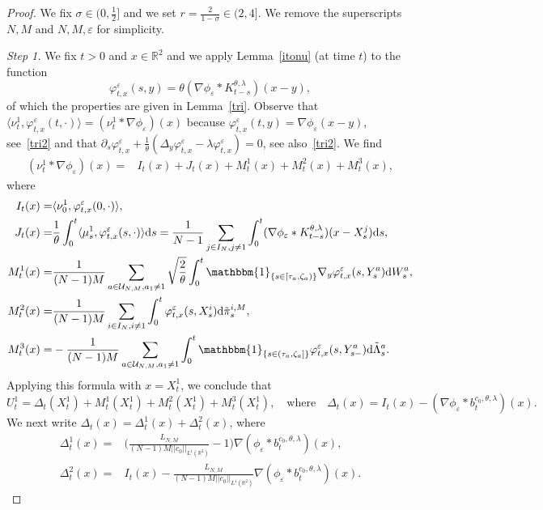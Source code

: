 \documentclass[11pt]{article}
\newcommand{\R}{\mathbb{R}}
\newcommand{\1}{\mathbbm{1}}
\newcommand{\dd}{{\rm d}}
\newcommand{\Uu}{\mathcal U}
\newcommand{\e}{\varepsilon}
\newcommand{\sm}{{s-}}
\newcommand{\vip}{\vskip5pt}
\begin{document}
\begin{proof}
We fix $\sigma\in (0,\frac12]$ and we set $r= \frac2{1-\sigma}\in (2,4]$. We remove the superscripts $N,M$ and $N,M,\e$ for simplicity.

\vip
{\it Step 1.} We fix $t>0$ and $x\in \R^2$ and we apply Lemma~\ref{itonu} (at time $t$) to the function
$$
\varphi^\e_{t,x}(s,y)=\theta(\nabla \phi_\e \ast K^{\theta,\lambda}_{t-s})(x-y), 
$$
of which the properties are given in Lemma~\ref{tri}.
Observe that $\langle \nu^1_t,\varphi^\e_{t,x}(t,\cdot)\rangle=
(\nu^1_t\ast \nabla \phi_\e)(x)$ because $\varphi^\e_{t,x}(t,y)=\nabla \phi_\e(x-y)$, see~\eqref{tri2}
and that $\partial_s \varphi^\e_{t,x}+\frac1\theta(\Delta_y\varphi^\e_{t,x}-\lambda\varphi^\e_{t,x})=0$, see 
also~\eqref{tri2}. We find
\begin{align}\label{tbua}
(\nu^1_t\ast \nabla \phi_\e)(x)=& I_t(x)+ J_t(x)+M^1_t(x)+M^2_t(x)+M^3_t(x),
\end{align}
where
\begin{align*}
I_t(x)=&\langle \nu^1_0,\varphi^\e_{t,x}(0,\cdot)\rangle,\\
J_t(x)=&\frac1\theta \int_0^t\langle \mu^1_s,\varphi^\e_{t,x}(s,\cdot)\rangle \dd s
=\frac1{N-1}\sum_{j\in I_N,j\neq 1}\int_0^t  (\nabla \phi_{\e}\ast K^{\theta,\lambda}_{t-s})(x-X^{j}_s)\dd s,\\
M^1_t(x)=&\frac1{(N-1)M}\sum_{a \in \Uu_{N,M},a_1\neq 1}\sqrt{\frac 2 \theta}\int_0^t \1_{\{s\in [\tau_a,\zeta_a)\}} 
\nabla_y\varphi^\e_{t,x}(s,Y^{a}_s) \dd W^a_s,\\
M^2_t(x)=&\frac1{(N-1)M}\sum_{i\in I_N,i\neq 1}\int_0^t \varphi^\e_{t,x}(s,X^{i}_s) \dd \tilde \pi_s^{i,M},\\
M^3_t(x)=&-\frac1{(N-1)M}\sum_{a \in \Uu_{N,M},a_1\neq 1}\int_0^t \1_{\{s\in (\tau_a,\zeta_a]\}} 
\varphi^\e_{t,x}(s,Y^{a}_\sm) \dd \tilde \Lambda^a_s.
\end{align*}
Applying this formula with $x=X^1_t$, we conclude that
$$
U^1_t=\Delta_t(X^1_t)+M^1_t(X^1_t)+M^2_t(X^1_t)+M^3_t(X^1_t), \quad \text{where} \quad
\Delta_t(x)= I_t(x)- (\nabla \phi_\e\ast b^{c_0,\theta,\lambda}_t)(x).
$$
We next write $\Delta_t(x)=\Delta^1_t(x)+\Delta^2_t(x)$, where
\begin{align*}
\Delta^1_t(x)=&\Big(\frac{L_{N,M}}{(N-1)M||c_0||_{L^1(\R^2)}}-1\Big) \nabla (\phi_\e\ast b^{c_0,\theta,\lambda}_t)(x),\\
\Delta^2_t(x)=&I_t(x) 
- \frac{L_{N,M}}{(N-1)M||c_0||_{L^1(\R^2)}} \nabla (\phi_\e\ast b^{c_0,\theta,\lambda}_t)(x).
\end{align*}

\end{proof}
\end{document}

